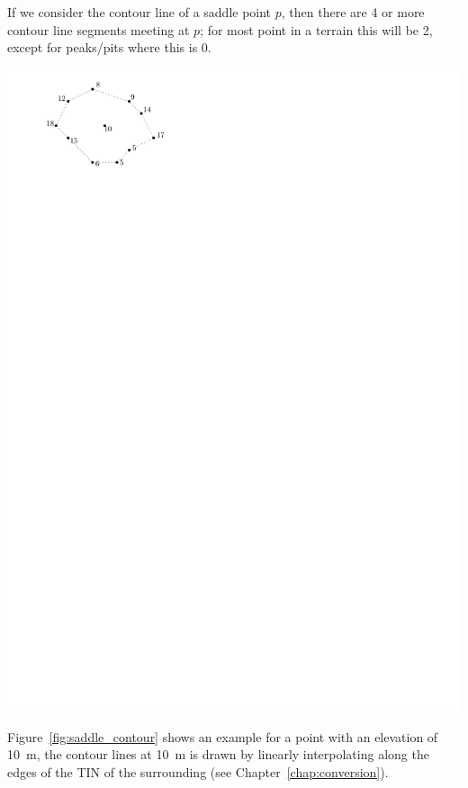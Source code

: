 If we consider the contour line of a saddle point $p$, then there are 4 or more contour line segments meeting at $p$; for most point in a terrain this will be 2, except for peaks/pits where this is 0.
\begin{marginfigure}
  \centering
  \includegraphics[page=2,width=\textwidth]{figs/saddle_contour}
  \caption{A saddle point at elevation \qty{10}{\m}, and its surrounding points. The triangulation of the area is created and used to extract the contour line segments at \qty{10}{\m} (red lines).}%
\label{fig:saddle_contour}
\end{marginfigure}
Figure~\ref{fig:saddle_contour} shows an example for a point with an elevation of \qty{10}{\m}, the contour lines at \qty{10}{\m} is drawn by linearly interpolating along the edges of the TIN of the surrounding (see Chapter~\ref{chap:conversion}).


